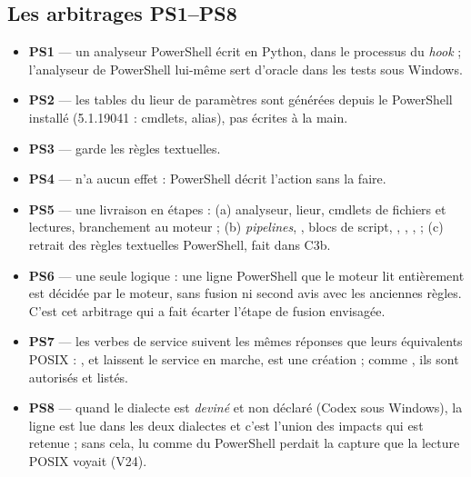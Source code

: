 \subsection{Les arbitrages PS1--PS8}
\begin{itemize}
  \item \textbf{PS1} --- un analyseur PowerShell écrit en Python, dans le processus du
    \textit{hook} ; l'analyseur de PowerShell lui-même sert d'oracle dans les tests sous Windows.
  \item \textbf{PS2} --- les tables du lieur de paramètres sont générées depuis le PowerShell
    installé (5.1.19041 : \cthreecmdlets{} cmdlets, \cthreealias{} alias), pas écrites à la main.
  \item \textbf{PS3} ---  garde les règles textuelles.
  \item \textbf{PS4} ---  n'a aucun effet : PowerShell décrit l'action sans la
    faire.
  \item \textbf{PS5} --- une livraison en étapes : (a) analyseur, lieur, cmdlets de fichiers et
    lectures, branchement au moteur ; (b) \textit{pipelines}, \cmd{\$( )}, blocs de script,
    , , \cmd{\&},  ; (c) retrait des règles textuelles
    PowerShell, fait dans C3b.
  \item \textbf{PS6} --- une seule logique : une ligne PowerShell que le moteur lit entièrement
    est décidée par le moteur, sans fusion ni second avis avec les anciennes règles. C'est cet
    arbitrage qui a fait écarter l'étape de fusion envisagée.
  \item \textbf{PS7} --- les verbes de service suivent les mêmes réponses que leurs équivalents
    POSIX : ,  et  laissent le
    service en marche,  est une création ; comme , ils sont
    autorisés et listés.
  \item \textbf{PS8} --- quand le dialecte est \emph{deviné} et non déclaré (Codex sous
    Windows), la ligne est lue dans les deux dialectes et c'est l'union des impacts qui est
    retenue ; sans cela,  lu comme du PowerShell perdait la capture que la
    lecture POSIX voyait (V24).
\end{itemize}

